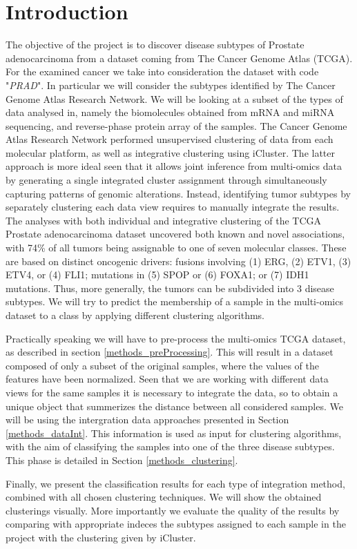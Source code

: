 \chapter{Introduction}
The objective of the project is to discover disease subtypes of Prostate adenocarcinoma from a dataset coming from The Cancer Genome Atlas (TCGA)\cite{hutter2018TCGA}. For the examined cancer we take into consideration the dataset with code "\textit{PRAD}". In particular we will consider the subtypes identified by The Cancer Genome Atlas Research Network\cite{abeshouse2015molecularPRAD}. We will be looking at a subset of the types of data analysed in\cite{abeshouse2015molecularPRAD}, namely the biomolecules  obtained from mRNA and miRNA sequencing, and reverse-phase protein array of the samples. The Cancer Genome Atlas Research Network performed unsupervised
clustering of data from each molecular platform, as well as integrative clustering using iCluster\cite{shen2009integrative}. The latter approach is more ideal seen that it allows joint inference from multi-omics data by generating a single integrated cluster assignment through simultaneously capturing patterns of genomic alterations. Instead, identifying tumor subtypes by separately clustering each data view requires to manually integrate the results.
The analyses with both individual and integrative clustering of the TCGA Prostate adenocarcinoma dataset uncovered both known and novel associations, with 74\% of all tumors being assignable to one of seven molecular classes. These are based on distinct oncogenic drivers: fusions involving (1) ERG, (2) ETV1, (3) ETV4, or (4) FLI1; mutations in (5) SPOP
or (6) FOXA1; or (7) IDH1 mutations. Thus, more generally, the tumors can be subdivided into 3 disease subtypes. We will try to predict the membership of a sample in the multi-omics dataset to a class by applying different clustering algorithms.\newline

Practically speaking we will have to pre-process the multi-omics TCGA dataset, as described in section \ref{methods_preProcessing}. This will result in a dataset composed of only a subset of the original samples, where the values of the features have been normalized. Seen that we are working with different data views for the same samples it is necessary to integrate the data, so to obtain a unique object that summerizes the distance between all considered samples. We will be using the intergration data approaches presented in Section \ref{methods_dataInt}. This information is used as input for clustering algorithms, with the aim of classifying the samples into one of the three disease subtypes. This phase is detailed in Section \ref{methods_clustering}.

Finally, we present the classification results for each type of integration method, combined with all chosen clustering techniques. We will show the obtained clusterings visually. More importantly we evaluate the quality of the results by comparing with appropriate indeces the subtypes assigned to each sample in the project with the clustering given by iCluster.